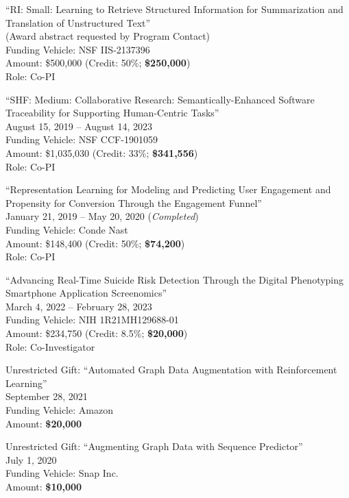 \documentclass[10pt]{article}
\newenvironment{myindentpar}[1]%
{\begin{list}{}%
         {\setlength{\leftmargin}{#1}}%
         \item[]%
}
{\end{list}}
\newcounter{list}
\begin{document}
\begin{myindentpar}{0.75cm}
\hspace{-0.75cm}``RI: Small: Learning to Retrieve Structured Information for Summarization and Translation of Unstructured Text'' \\
(Award abstract requested by Program Contact) \\
Funding Vehicle: NSF IIS-2137396 \\
Amount: \$500,000 (Credit: 50\%; \textbf{\$250,000}) \\
Role: {Co-PI}

\hspace{-0.75cm}``SHF: Medium: Collaborative Research: Semantically-Enhanced Software Traceability for Supporting Human-Centric Tasks'' \\
August 15, 2019 -- August 14, 2023 \\
Funding Vehicle: NSF CCF-1901059 \\
Amount: \$1,035,030 (Credit: 33\%; \textbf{\$341,556}) \\
Role: {Co-PI}

\newpage
\hspace{-0.75cm}``Representation Learning for Modeling and Predicting User Engagement and Propensity for Conversion Through the Engagement Funnel'' \\
January 21, 2019 -- May 20, 2020 (\emph{Completed}) \\
Funding Vehicle: Conde Nast \\
Amount: \$148,400 (Credit: 50\%; \textbf{\$74,200}) \\
Role: {Co-PI}

\hspace{-0.75cm}``Advancing Real-Time Suicide Risk Detection Through the Digital Phenotyping Smartphone Application Screenomics'' \\
March 4, 2022 -- February 28, 2023 \\
Funding Vehicle: NIH 1R21MH129688-01 \\
Amount: \$234,750 (Credit: 8.5\%; \textbf{\$20,000}) \\
Role: {Co-Investigator}

\hspace{-0.75cm}Unrestricted Gift: ``Automated Graph Data Augmentation with Reinforcement Learning''\\
September 28, 2021 \\
Funding Vehicle: Amazon \\
Amount: \textbf{\$20,000}

\hspace{-0.75cm}Unrestricted Gift: ``Augmenting Graph Data with Sequence Predictor'' \\
July 1, 2020 \\
Funding Vehicle: Snap Inc. \\
Amount: \textbf{\$10,000}


\end{myindentpar}
\end{document}
